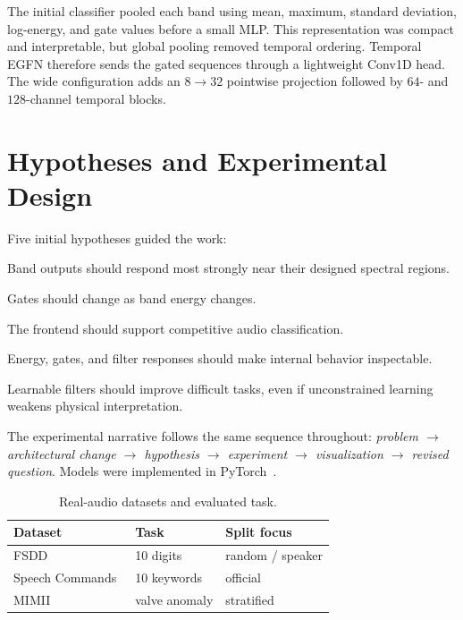 \documentclass[10pt,twocolumn]{article}
\newcommand{\egfn}{EGFN}
\begin{document}
The initial classifier pooled each band using mean, maximum, standard
deviation, log-energy, and gate values before a small MLP. This representation
was compact and interpretable, but global pooling removed temporal ordering.
Temporal \egfn{} therefore sends the gated sequences through a lightweight
Conv1D head. The wide configuration adds an $8\!\rightarrow\!32$ pointwise
projection followed by $64$- and $128$-channel temporal blocks.

\section{Hypotheses and Experimental Design}

Five initial hypotheses guided the work:
\begin{description}[style=nextline]
  \item[H1: Frequency decomposition.] Band outputs should respond most strongly
  near their designed spectral regions.
  \item[H2: Energy-dependent modulation.] Gates should change as band energy
  changes.
  \item[H3: Predictive utility.] The frontend should support competitive audio
  classification.
  \item[H4: Observability.] Energy, gates, and filter responses should make
  internal behavior inspectable.
  \item[H5: Adaptation.] Learnable filters should improve difficult tasks, even
  if unconstrained learning weakens physical interpretation.
\end{description}

The experimental narrative follows the same sequence throughout:
\emph{problem $\rightarrow$ architectural change $\rightarrow$ hypothesis
$\rightarrow$ experiment $\rightarrow$ visualization $\rightarrow$ revised
question}. Models were implemented in PyTorch~\cite{paszke2019pytorch}.

\begin{table}[t]
\centering
\caption{Real-audio datasets and evaluated task.}
\label{tab:datasets}
\small
\begin{tabular}{@{}lll@{}}
\toprule
Dataset & Task & Split focus \\
\midrule
FSDD~\cite{jackson2016fsdd} & 10 digits & random / speaker \\
Speech Commands~\cite{warden2018speech} & 10 keywords & official \\
MIMII~\cite{purohit2019mimii} & valve anomaly & stratified \\
\bottomrule
\end{tabular}
\end{table}
\end{document}
